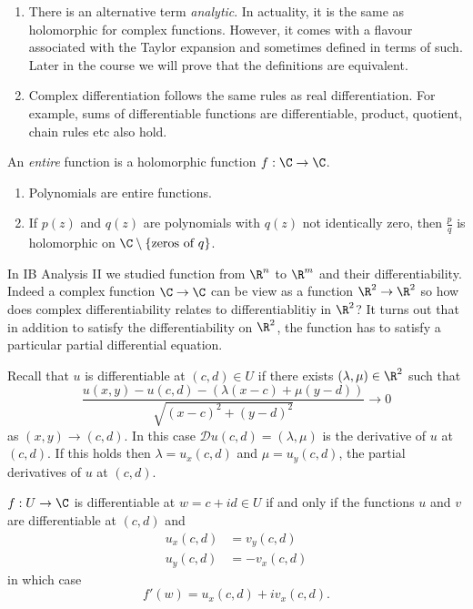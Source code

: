 \documentclass[a4paper]{article}
\newcommand*{\D}{\mathcal{D}}
\begin{document}
\begin{remark}\leavevmode
  \begin{enumerate}
  \item There is an alternative term \emph{analytic}. In actuality, it is the same as holomorphic for complex functions. However, it comes with a flavour associated with the Taylor expansion and sometimes defined in terms of such. Later in the course we will prove that the definitions are equivalent.
  \item Complex differentiation follows the same rules as real differentiation. For example, sums of differentiable functions are differentiable, product, quotient, chain rules etc also hold.
  \end{enumerate}
\end{remark}

\begin{definition}[Entire]
  An \emph{entire} function is a holomorphic function \(f: \C \to \C\).
\end{definition}

\begin{eg}\leavevmode
  \begin{enumerate}
  \item Polynomials are entire functions.
  \item If \(p(z)\) and \(q(z)\) are polynomials with \(q(z)\) not identically zero, then \(\frac{p}{q}\) is holomorphic on \(\C \setminus \{\text{zeros of } q\}\).
  \end{enumerate}
\end{eg}

In IB Analysis II we studied function from \(\R^n\) to \(\R^m\) and their differentiability. Indeed a complex function \(\C \to \C\) can be view as a function \(\R^2 \to \R^2\) so how does complex differentiability relates to differentiablitiy in \(\R^2\)? It turns out that in addition to satisfy the differentiability on \(\R^2\), the function has to satisfy a particular partial differential equation.

Recall that \(u\) is differentiable at \((c, d) \in U\) if there exists \((\lambda, \mu) \in \R^2\) such that
\[
  \frac{u(x, y) - u(c, d) - (\lambda(x - c) + \mu(y -d))}{\sqrt{(x - c)^2 + (y - d)^2}} \to 0
\]
as \((x, y) \to (c, d)\). In this case \(\D u(c, d) = (\lambda, \mu)\) is the derivative of \(u\) at \((c, d)\). If this holds then \(\lambda = u_x(c, d)\) and \(\mu = u_y(c, d)\), the partial derivatives of \(u\) at \((c, d)\).

\begin{theorem}
  \(f: U \to \C\) is differentiable at \(w = c + id \in U\) if and only if the functions \(u\) and \(v\) are differentiable at \((c, d)\) and
  \begin{align*}
    u_x(c, d) &= v_y(c, d) \\
    u_y(c, d) &= -v_x(c, d)
  \end{align*}
  in which case
  \[
    f'(w) = u_x(c, d) + iv_x(c, d).
  \]
\end{theorem}
\end{document}
